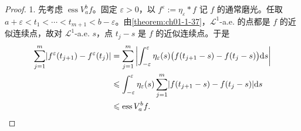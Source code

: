 \documentclass[../../main.tex]{subfiles}%
\begin{document}
\begin{proof}
1. 先考虑 $\operatorname{ess}V_a^b f$。固定 $\varepsilon>0$，以 $f^\varepsilon:=\eta_\varepsilon*f$ 记 $f$ 的通常磨光。任取 $a+\varepsilon<t_1<\cdots<t_{m+1}<b-\varepsilon$。由\cref{theorem:ch01-1-37}，$\mathcal{L}^1$-a.e. 的点都是 $f$ 的近似连续点，故对 $\mathcal{L}^1$-a.e. $s$，点 $t_j-s$ 是 $f$ 的近似连续点。于是 %
\begin{align*}
\sum_{j=1}^m\lvert f^\varepsilon(t_{j+1})-f^\varepsilon(t_j)\rvert
&=\sum_{j=1}^m\left\lvert\int_{-\varepsilon}^{\varepsilon}\eta_\varepsilon(s)\bigl(f(t_{j+1}-s)-f(t_j-s)\bigr)\mathrm{d} s\right\rvert\\
&\leqslant\int_{-\varepsilon}^{\varepsilon}\eta_\varepsilon(s)\sum_{j=1}^m\lvert f(t_{j+1}-s)-f(t_j-s)\rvert\mathrm{d} s\\
&\leqslant\operatorname{ess}V_a^b f .
\end{align*}


\end{proof}
\end{document}
